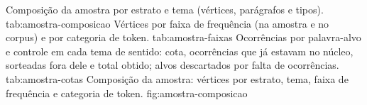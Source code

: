     {Composição da amostra por estrato e tema (vértices, parágrafos e tipos).}
    {tab:amostra-composicao}
    {Vértices por faixa de frequência (na amostra e no corpus) e por categoria de token.}
    {tab:amostra-faixas}
    {Ocorrências por palavra-alvo e controle em cada tema de sentido: cota, ocorrências que já
    estavam no núcleo, sorteadas fora dele e total obtido; alvos descartados por falta de
    ocorrências.}
    {tab:amostra-cotas}
    {Composição da amostra: vértices por estrato, tema, faixa de frequência e categoria de
    token.}
    {fig:amostra-composicao}
